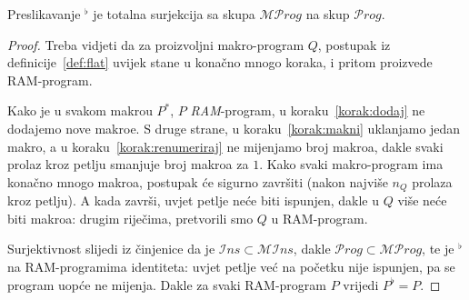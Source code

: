 \begin{propozicija}[{name=[spljoštenje projicira $\mathcal{MP}rog$ na $\mathcal Prog$]}]
Preslikavanje ${}^\flat$ je totalna surjekcija sa skupa $\mathcal{MP}rog$ na skup $\mathcal Prog$.
\end{propozicija}
\begin{proof}
Treba vidjeti da za proizvoljni makro-program $Q$, postupak iz definicije~\ref{def:flat} uvijek stane u konačno mnogo koraka, i pritom proizvede RAM-program.

Kako je u svakom makrou $P^*$, $P$ \emph{RAM}-program, u koraku~\ref{korak:dodaj} ne dodajemo nove makroe. S druge strane, u koraku~\ref{korak:makni} uklanjamo jedan makro, a u koraku~\ref{korak:renumeriraj} ne mijenjamo broj makroa, dakle svaki prolaz kroz petlju smanjuje broj makroa za $1$. Kako svaki makro-program ima konačno mnogo makroa, postupak će sigurno završiti (nakon najviše $n_Q$ prolaza kroz petlju). A kada završi, uvjet petlje neće biti ispunjen, dakle u $Q$ više neće biti makroa: drugim riječima, pretvorili smo  $Q$ u RAM-program.

Surjektivnost slijedi iz činjenice da je $\mathcal Ins\subset\mathcal{MI}ns$, dakle $\mathcal Prog\subset\mathcal{MP}rog$, te je ${}^\flat$ na RAM-programima identiteta: uvjet petlje već na početku nije ispunjen, pa se program uopće ne mijenja. Dakle za svaki RAM-program $P$ vrijedi $P^\flat=P$.
\end{proof}


